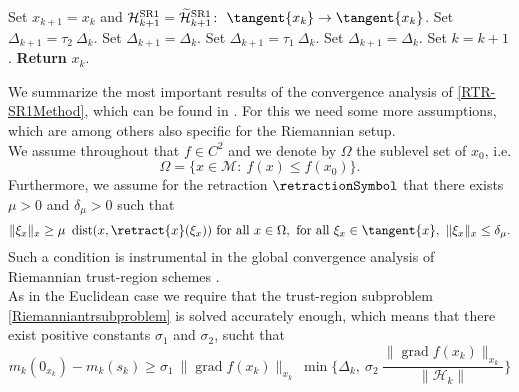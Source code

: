 \begin{algorithm}[H]
\begin{algorithmic}[1]
			\Else 
				\State Set $x_{k+1} = x_k$ and $\mathcal{H}^\mathrm{SR1}_{k+1} = \widetilde{\mathcal{H}}^\mathrm{SR1}_{k+1} \colon \ \tangent{x_{k}} \to \tangent{x_{k}}$.
            \EndIf 
                    \State Set $\Delta_{k+1} = \tau_2 \ \Delta_k$.
                \Else 
                    \State Set $\Delta_{k+1} = \Delta_k$.
                \EndIf 
			\Else 
                    \State Set $\Delta_{k+1} = \tau_1 \ \Delta_k$.
                \Else 
                    \State Set $\Delta_{k+1} = \Delta_k$.
                \EndIf 
            \EndIf 
            \State Set $k = k+1$.
        \EndWhile
        \State \textbf{Return} $x_k$.
    \end{algorithmic}
\end{algorithm}
We summarize the most important results of the convergence analysis of \cref{RTR-SR1Method}, which can be found in \cite{HuangAbsilGallivan:2014}. For this we need some more assumptions, which are among others also specific for the Riemannian setup. \\
We assume throughout that $f \in C^2$ and we denote by $\Omega$ the sublevel set of $x_0$, i.e.
\begin{equation*}
    \Omega = \{ x \in \mathcal{M} \colon \ f(x) \leq f(x_0) \}.
\end{equation*}
Furthermore, we assume for the retraction $\retractionSymbol$ that there exists $\mu > 0$ and $\delta_{\mu} > 0$ such that
\begin{equation}\label{RetractionAssumption}
    \lVert \xi_x \rVert_x \geq \mu \ \operatorname{dist}(x, \retract{x}(\xi_x)) \text{ for all } x \in \Omega, \text{ for all } \xi_x \in \tangent{x}, \ \lVert \xi_x \rVert_x \leq \delta_{\mu}.
\end{equation}
Such a condition is instrumental in the global convergence analysis of Riemannian trust-region schemes \cite[p.~7]{HuangAbsilGallivan:2014}. \\
As in the Euclidean case we require that the trust-region subproblem \cref{Riemanniantrsubproblem} is solved accurately enough, which means that there exist positive constants $\sigma_1$ and $\sigma_2$, sucht that 
\begin{equation}\label{RiemannianAccuracy1}
    m_k(0_{x_k}) - m_k(s_k) \geq \sigma_1 \ \lVert \operatorname{grad} f(x_k) \rVert_{x_k} \ \min \Bigg \{ \Delta_k, \ \sigma_2 \ \frac{\lVert \operatorname{grad} f(x_k) \rVert_{x_k}}{\lVert \mathcal{H}_k \rVert} \Bigg \}
\end{equation} 

